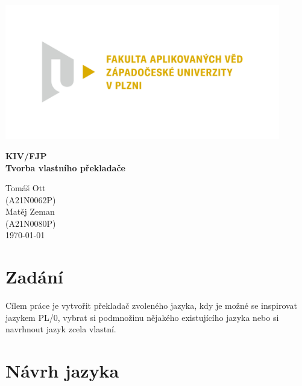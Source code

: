 \documentclass[ 12pt, a4paper]{article}
\begin{document}
\def\code#1{\texttt{#1}}

%
\centerline{\includegraphics[width=12cm]{logo.png}}
\vspace*{50px}
\begin{center}
	{\LARGE\bf\noindent KIV/FJP \\ Tvorba vlastního překladače}\\
	\vspace*{40px}  
	
	Tomáš Ott\\
	(A21N0062P)\\
	\vspace*{10px}  	
	Matěj Zeman\\
	(A21N0080P)\\
	
	\vspace*{\fill}  
	\hspace*{\fill} \today \\
\end{center}
\newpage
\tableofcontents
\newpage



\section{Zadání}
Cílem práce je vytvořit překladač zvoleného jazyka, kdy je možné se inspirovat jazykem PL/0, vybrat si podmnožinu nějakého existujícího jazyka nebo si navrhnout jazyk zcela vlastní.

\newpage
\section{Návrh jazyka}
\end{document}
